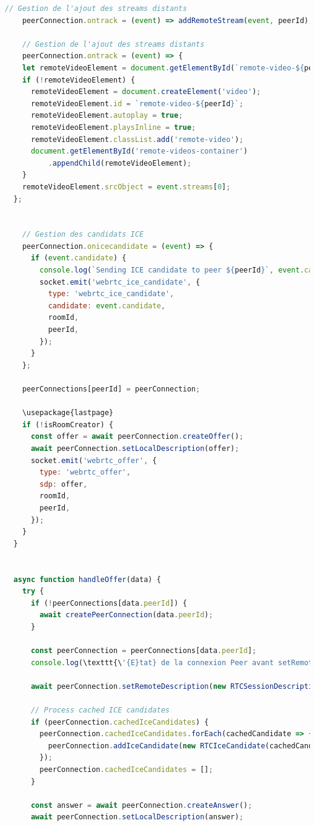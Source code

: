 \documentclass[12pt, a4paper, oneside]{Thesis}
\begin{document}
\begin{lstlisting}[language=JavaScript, caption={Fonctions Principales}, label=Fonctions Principales]
    // Gestion de l'ajout des streams distants
    peerConnection.ontrack = (event) => addRemoteStream(event, peerId);

    // Gestion de l'ajout des streams distants
    peerConnection.ontrack = (event) => {
    let remoteVideoElement = document.getElementById(`remote-video-${peerId}`);
    if (!remoteVideoElement) {
      remoteVideoElement = document.createElement('video');
      remoteVideoElement.id = `remote-video-${peerId}`;
      remoteVideoElement.autoplay = true;
      remoteVideoElement.playsInline = true;
      remoteVideoElement.classList.add('remote-video');
      document.getElementById('remote-videos-container')
          .appendChild(remoteVideoElement);
    }
    remoteVideoElement.srcObject = event.streams[0];
  };


    // Gestion des candidats ICE
    peerConnection.onicecandidate = (event) => {
      if (event.candidate) {
        console.log(`Sending ICE candidate to peer ${peerId}`, event.candidate);
        socket.emit('webrtc_ice_candidate', {
          type: 'webrtc_ice_candidate',
          candidate: event.candidate,
          roomId,
          peerId,
        });
      }
    };

    peerConnections[peerId] = peerConnection;

    \usepackage{lastpage}
    if (!isRoomCreator) {
      const offer = await peerConnection.createOffer();
      await peerConnection.setLocalDescription(offer);
      socket.emit('webrtc_offer', {
        type: 'webrtc_offer',
        sdp: offer,
        roomId,
        peerId,
      });
    }
  }


  async function handleOffer(data) {
    try {
      if (!peerConnections[data.peerId]) {
        await createPeerConnection(data.peerId);
      }

      const peerConnection = peerConnections[data.peerId];
      console.log(\texttt{\'{E}tat} de la connexion Peer avant setRemoteDescription: $\backslash$texttt{${peerConnection.signalingState}}$`);

      await peerConnection.setRemoteDescription(new RTCSessionDescription(data.sdp));

      // Process cached ICE candidates
      if (peerConnection.cachedIceCandidates) {
        peerConnection.cachedIceCandidates.forEach(cachedCandidate => {
          peerConnection.addIceCandidate(new RTCIceCandidate(cachedCandidate));
        });
        peerConnection.cachedIceCandidates = [];
      }

      const answer = await peerConnection.createAnswer();
      await peerConnection.setLocalDescription(answer);


\end{lstlisting}
\end{document}
